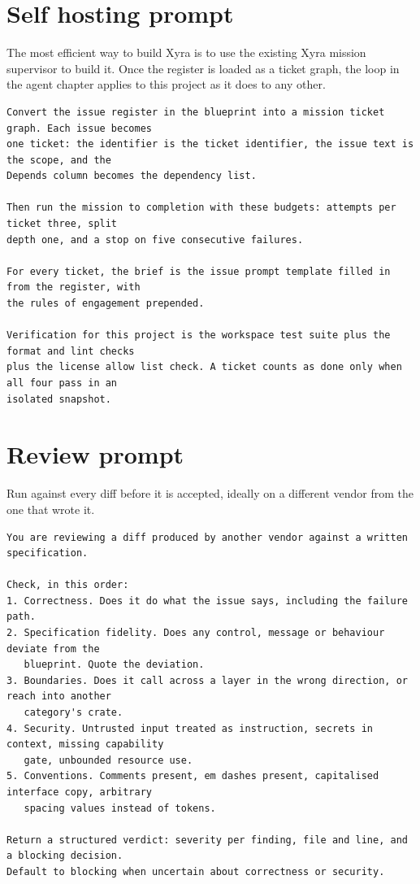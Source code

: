 \section{Self hosting prompt}

The most efficient way to build Xyra is to use the existing Xyra mission supervisor to build
it. Once the register is loaded as a ticket graph, the loop in the agent chapter applies to
this project as it does to any other.

\begin{lstlisting}
Convert the issue register in the blueprint into a mission ticket graph. Each issue becomes
one ticket: the identifier is the ticket identifier, the issue text is the scope, and the
Depends column becomes the dependency list.

Then run the mission to completion with these budgets: attempts per ticket three, split
depth one, and a stop on five consecutive failures.

For every ticket, the brief is the issue prompt template filled in from the register, with
the rules of engagement prepended.

Verification for this project is the workspace test suite plus the format and lint checks
plus the license allow list check. A ticket counts as done only when all four pass in an
isolated snapshot.
\end{lstlisting}

\section{Review prompt}

Run against every diff before it is accepted, ideally on a different vendor from the one that
wrote it.

\begin{lstlisting}
You are reviewing a diff produced by another vendor against a written specification.

Check, in this order:
1. Correctness. Does it do what the issue says, including the failure path.
2. Specification fidelity. Does any control, message or behaviour deviate from the
   blueprint. Quote the deviation.
3. Boundaries. Does it call across a layer in the wrong direction, or reach into another
   category's crate.
4. Security. Untrusted input treated as instruction, secrets in context, missing capability
   gate, unbounded resource use.
5. Conventions. Comments present, em dashes present, capitalised interface copy, arbitrary
   spacing values instead of tokens.

Return a structured verdict: severity per finding, file and line, and a blocking decision.
Default to blocking when uncertain about correctness or security.
\end{lstlisting}

